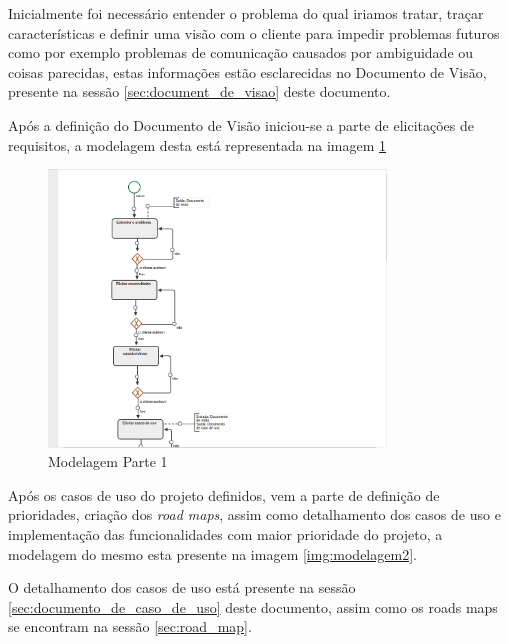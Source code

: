 
Inicialmente foi necessário entender o problema do qual iriamos tratar, traçar características e definir uma visão com o cliente para impedir problemas futuros como por exemplo problemas de comunicação causados por ambiguidade ou coisas parecidas, estas informações estão esclarecidas no Documento de Visão, presente na sessão \ref{sec:document_de_visao} deste documento.

Após a definição do Documento de Visão iniciou-se a parte de elicitações de requisitos, a modelagem desta está representada na imagem \ref{img:modelagem1}

\begin{figure}[!h]
	\centering
	\includegraphics[width=0.8\textwidth]{imgModelagem/modelagem1}
	\caption{Modelagem Parte 1}
	\label{img:modelagem1}
\end{figure}

Após os casos de uso do projeto definidos, vem a parte de definição de prioridades, criação dos \textit{road maps}, assim como detalhamento dos casos de uso e implementação das funcionalidades com maior prioridade do projeto, a modelagem do mesmo esta presente na imagem \ref{img:modelagem2}.

O detalhamento dos casos de uso está presente na sessão \ref{sec:documento_de_caso_de_uso} deste documento, assim como os roads maps se encontram na sessão \ref{sec:road_map}.

